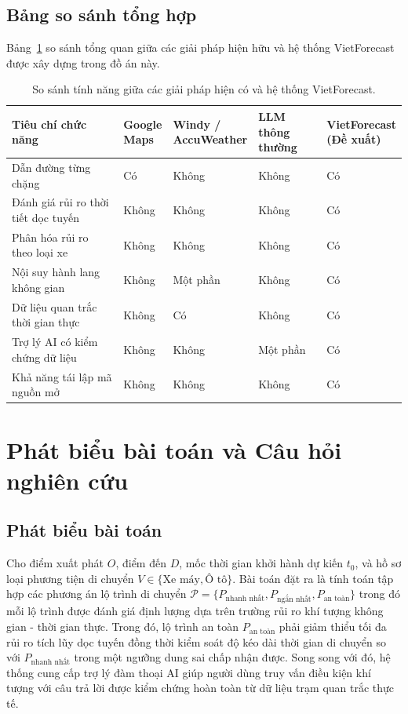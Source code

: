 \subsection{Bảng so sánh tổng hợp}
Bảng~\ref{tab:solutions_comparison_vi} so sánh tổng quan giữa các giải pháp hiện hữu và hệ thống VietForecast được xây dựng trong đồ án này.

\begin{table}[H]
\centering
\caption{So sánh tính năng giữa các giải pháp hiện có và hệ thống VietForecast.}
\label{tab:solutions_comparison_vi}
\footnotesize
\renewcommand{\arraystretch}{0.88}
\begin{tabularx}{\textwidth}{>{\raggedright\arraybackslash}p{5.0cm} *{4}{>{\centering\arraybackslash}X}}
\toprule
Tiêu chí chức năng & \makecell{Google\\Maps} & \makecell{Windy /\\AccuWeather} & \makecell{LLM\\thông thường} & \makecell{VietForecast\\(Đề xuất)} \\
\midrule
Dẫn đường từng chặng & Có & Không & Không & Có \\
Đánh giá rủi ro thời tiết dọc tuyến & Không & Không & Không & Có \\
Phân hóa rủi ro theo loại xe & Không & Không & Không & Có \\
Nội suy hành lang không gian & Không & Một phần & Không & Có \\
Dữ liệu quan trắc thời gian thực & Không & Có & Không & Có \\
Trợ lý AI có kiểm chứng dữ liệu & Không & Không & Một phần & Có \\
Khả năng tái lập mã nguồn mở & Không & Không & Không & Có \\
\bottomrule
\end{tabularx}
\end{table}

\section{Phát biểu bài toán và Câu hỏi nghiên cứu}

\subsection{Phát biểu bài toán}
Cho điểm xuất phát $O$, điểm đến $D$, mốc thời gian khởi hành dự kiến $t_0$, và hồ sơ loại phương tiện di chuyển $V \in \{\text{Xe máy}, \text{Ô tô}\}$. Bài toán đặt ra là tính toán tập hợp các phương án lộ trình di chuyển $\mathcal{P} = \{P_{\text{nhanh nhất}}, P_{\text{ngắn nhất}}, P_{\text{an toàn}}\}$ trong đó mỗi lộ trình được đánh giá định lượng dựa trên trường rủi ro khí tượng không gian - thời gian thực. Trong đó, lộ trình an toàn $P_{\text{an toàn}}$ phải giảm thiểu tối đa rủi ro tích lũy dọc tuyến đồng thời kiểm soát độ kéo dài thời gian di chuyển so với $P_{\text{nhanh nhất}}$ trong một ngưỡng dung sai chấp nhận được. Song song với đó, hệ thống cung cấp trợ lý đàm thoại AI giúp người dùng truy vấn điều kiện khí tượng với câu trả lời được kiểm chứng hoàn toàn từ dữ liệu trạm quan trắc thực tế.

